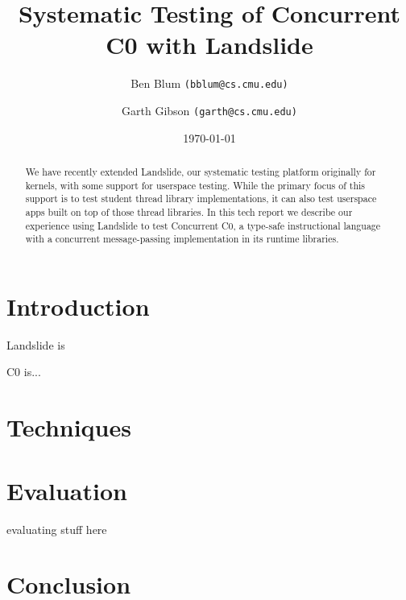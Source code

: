 \documentclass{article}
\title{{\bf Systematic Testing of Concurrent C0 with Landslide}}
\author{Ben Blum \texttt{(bblum@cs.cmu.edu)} \and Garth Gibson \texttt{(garth@cs.cmu.edu)}}
\date{\today}
\begin{document}
\maketitle

\begin{abstract}
We have recently extended Landslide, our systematic testing platform originally for kernels, with some support for userspace testing. While the primary focus of this support is to test student thread library implementations, it can also test userspace apps built on top of those thread libraries. In this tech report we describe our experience using Landslide to test Concurrent C0, a type-safe instructional language with a concurrent message-passing implementation in its runtime libraries.
\end{abstract}

\section{Introduction}

Landslide \cite{landslide} is

C0 \cite{c0} is...

\section{Techniques}

\section{Evaluation}

evaluating stuff here



\section{Conclusion}

{}

\end{document}
